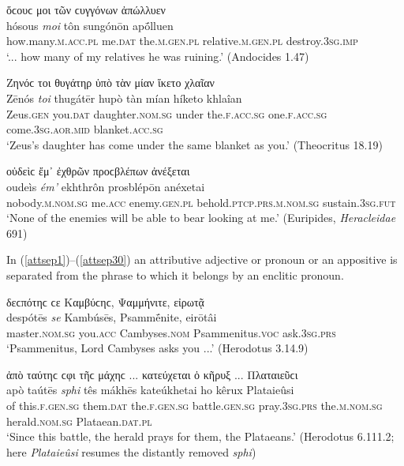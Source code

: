 \begin{exe}
\ex ὅϲουϲ μοι τῶν ϲυγγόνων ἀπώλλυεν\\
\gll hósous \emph{moi} tôn sungónōn apṓlluen\\
how.many.\textsc{m.acc.pl} me.\textsc{dat} the.\textsc{m.gen.pl}
relative.\textsc{m.gen.pl} destroy.\textsc{3sg.imp}\\
\trans `... how many of my relatives he was ruining.' (Andocides 1.47)
\label{gensep6}
\end{exe}

\begin{exe}
\ex Ζηνόϲ τοι θυγάτηρ ὑπὸ τὰν μίαν ἵκετο χλαῖαν\\
\gll Zēnós \emph{toi} thugátēr hupò tàn mían híketo khlaîan\\
Zeus.\textsc{gen} you.\textsc{dat} daughter.\textsc{nom.sg} under the.\textsc{f.acc.sg} one.\textsc{f.acc.sg} come.\textsc{3sg.aor.mid} blanket.\textsc{acc.sg}\\
\trans `Zeus's daughter has come under the same blanket as you.' (Theocritus 18.19)
\label{gensep7}
\end{exe}

\begin{exe}
\ex οὐδεὶϲ ἔμ᾽ ἐχθρῶν προϲβλέπων ἀνέξεται\\
\gll oudeìs \emph{ém'} ekhthrôn prosblépōn anéxetai\\
nobody.\textsc{m.nom.sg} me.\textsc{acc} enemy.\textsc{gen.pl}
behold.\textsc{ptcp.prs.m.nom.sg} sustain.\textsc{3sg.fut}\\
\trans `None of the enemies will be able to bear looking at me.' (Euripides, \textit{Heracleidae} 691)
\label{gensep8}
\end{exe}

In (\ref{attsep1})--(\ref{attsep30}) an attributive adjective or pronoun or an appositive is separated from the phrase to which it belongs by an enclitic pronoun.

\begin{exe}
\ex δεϲπότηϲ ϲε Καμβύϲηϲ, Ψαμμήνιτε, εἰρωτᾷ\\
\gll despótēs \emph{se} Kambúsēs, Psammḗnite, eirōtâi\\
master.\textsc{nom.sg} you.\textsc{acc} Cambyses.\textsc{nom}
Psammenitus.\textsc{voc} ask.\textsc{3sg.prs}\\
\trans `Psammenitus, Lord Cambyses asks you ...' (Herodotus 3.14.9)
\label{attsep1}
\end{exe}

\begin{exe}
\ex ἀπὸ ταύτηϲ ϲφι τῆϲ μάχηϲ ... κατεύχεται ὁ κῆρυξ ... Πλαταιεῦϲι\\
\gll apò taútēs \emph{sphi} tês mákhēs kateúkhetai ho kêrux Plataieûsi\\
of this.\textsc{f.gen.sg} them.\textsc{dat} the.\textsc{f.gen.sg} battle.\textsc{gen.sg} pray.\textsc{3sg.prs} the.\textsc{m.nom.sg} herald.\textsc{nom.sg} Plataean.\textsc{dat.pl}\\
\trans `Since this battle, the herald prays for them, the Plataeans.' (Herodotus 6.111.2; here \textit{Plataieûsi} resumes the distantly removed \textit{sphi})
\label{attsep2}
\end{exe}

